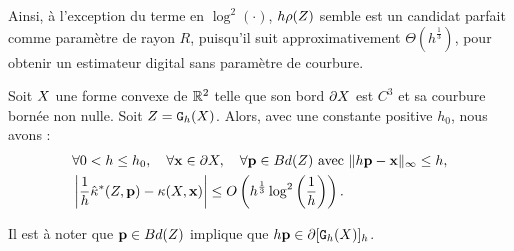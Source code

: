 Ainsi, à l'exception du terme en $\log^2(\cdot)$, $h \rho(Z)$ semble est
un candidat parfait comme paramètre de rayon $R$, puisqu'il suit
approximativement $\Theta(h^\frac{1}{3})$, pour obtenir un estimateur digital
sans paramètre de courbure.
%
\begin{theorem}{}
\label{thm:curvature-estimator-2d-pf-conv}
  Soit $X$ une forme convexe de $\mathbb{R}^2$ telle que son bord $\partial X$ est
  $C^3$ et sa courbure bornée non nulle. Soit $Z = \mathtt{G}_{h}(X)$. Alors, avec une
  constante positive $h_0$, nous avons :
  \begin{align}
    &\forall 0 < h \le h_0, \quad \forall \mathbf{x} \in \partial X, \quad \forall \mathbf{p} \in Bd({Z}) \text{~avec~} \| h\mathbf{p} -\mathbf{x}\|_\infty \le h, \nonumber\\
    &\left | \frac{1}{h}\hat{\kappa}^{*}(Z,\mathbf{p}) - \kappa(X,\mathbf{x}) \right| \le O\left( h^{\frac{1}{3}} \log^2 \left(\frac{1}{h}\right)\right) .
  \end{align}
\end{theorem}
%
Il est à noter que $\mathbf{p} \in Bd({Z})$ implique que $h\mathbf{p} \in
\partial \lbrack \mathtt{G}_{h}(X) \rbrack_{h}$.


